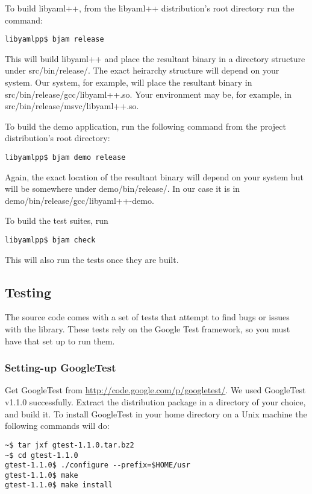 \documentclass{article}
\begin{document}
To build libyaml++, from the libyaml++ distribution's root directory run the
command:

\begin{verbatim}
libyamlpp$ bjam release
\end{verbatim}

This will build libyaml++ and place the resultant binary in a directory
structure under src/bin/release/.  The exact heirarchy structure will depend on
your system.  Our system, for example, will place the resultant binary in
src/bin/release/gcc/libyaml++.so.  Your environment may be, for example, in
src/bin/release/msvc/libyaml++.so.

To build the demo application, run the following command from the project
distribution's root directory:

\begin{verbatim}
libyamlpp$ bjam demo release
\end{verbatim}

Again, the exact location of the resultant binary will depend on your system
but will be somewhere under demo/bin/release/.  In our case it is in
demo/bin/release/gcc/libyaml++-demo.

To build the test suites, run

\begin{verbatim}
libyamlpp$ bjam check
\end{verbatim}

This will also run the tests once they are built.

\subsection{Testing}

The source code comes with a set of tests that attempt to find bugs or issues
with the library.  These tests rely on the Google Test framework, so you must
have that set up to run them.

\subsubsection{Setting-up GoogleTest}

Get GoogleTest from \url{http://code.google.com/p/googletest/}.  We used GoogleTest
v1.1.0 successfully.  Extract the distribution package in a directory of your
choice, and build it.  To install GoogleTest in your home directory on a Unix
machine the following commands will do:

\begin{verbatim}
~$ tar jxf gtest-1.1.0.tar.bz2
~$ cd gtest-1.1.0
gtest-1.1.0$ ./configure --prefix=$HOME/usr
gtest-1.1.0$ make
gtest-1.1.0$ make install
\end{verbatim}
\end{document}
